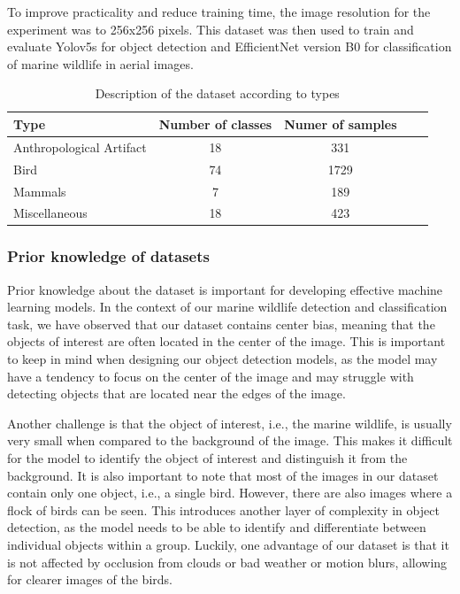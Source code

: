 To improve practicality and reduce training time, the image resolution for the experiment was to 256x256 pixels. This dataset was then used to train and evaluate Yolov5s for object detection and EfficientNet version B0 for classification of marine wildlife in aerial images.

\begin{table}[!h]
\centering
\begin{tabular}{lcccc}
\toprule
Type & Number of classes & Numer of samples\\
\midrule
Anthropological Artifact & 18  &  331\\
Bird & 74  & 1729\\
Mammals & 7  &  189\\
Miscellaneous & 18   & 423\\
\bottomrule
\end{tabular}
\caption{Description of the dataset according to types}
\label{tab:dataset}
\end{table}



\subsubsection{Prior knowledge of datasets}
Prior knowledge about the dataset is important for developing effective machine learning models. In the context of our marine wildlife detection and classification task, we have observed that our dataset contains center bias, meaning that the objects of interest are often located in the center of the image. This is important to keep in mind when designing our object detection models, as the model may have a tendency to focus on the center of the image and may struggle with detecting objects that are located near the edges of the image.

Another challenge is that the object of interest, i.e., the marine wildlife, is usually very small when compared to the background of the image. This makes it difficult for the model to identify the object of interest and distinguish it from the background. It is also important to note that most of the images in our dataset contain only one object, i.e., a single bird. However, there are also images where a flock of birds can be seen. This introduces another layer of complexity in object detection, as the model needs to be able to identify and differentiate between individual objects within a group. Luckily, one advantage of our dataset is that it is not affected by occlusion from clouds or bad weather or motion blurs, allowing for clearer images of the birds. 

